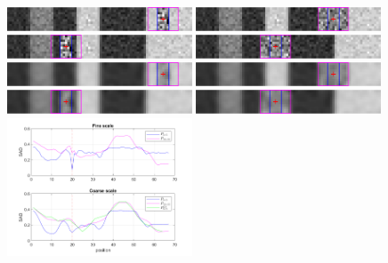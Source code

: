 \documentclass[runningheads]{llncs}
\begin{document}
\begin{figure}[t]
    \begin{center}
        \includegraphics[width=0.49\textwidth]{figures/high_resolution_success_imL_fine.png}
        \includegraphics[width=0.49\textwidth]{figures/low_resolution_success_imL_fine.png}\\
        \includegraphics[width=0.49\textwidth]{figures/high_resolution_success_imR_fine.png}
        \includegraphics[width=0.49\textwidth]{figures/low_resolution_success_imR_fine.png}\\
        \includegraphics[width=0.49\textwidth]{figures/high_resolution_success_imL_coarse.png}
        \includegraphics[width=0.49\textwidth]{figures/low_resolution_success_imL_coarse.png}\\
        \includegraphics[width=0.49\textwidth]{figures/high_resolution_success_imR_coarse.png}
        \includegraphics[width=0.49\textwidth]{figures/low_resolution_success_imR_coarse.png}\\
        \includegraphics[width=0.49\textwidth]{paper/latex/figures/high_resolution_success_graph.png}

\end{center}
\end{figure}
\end{document}
